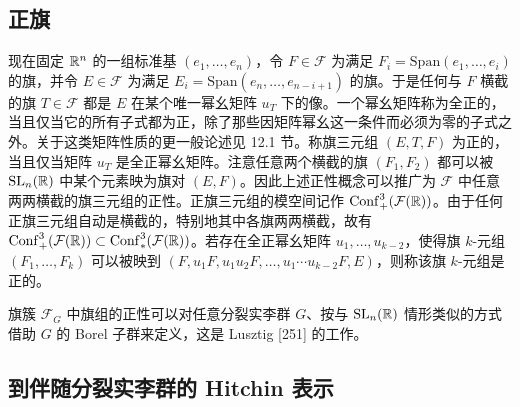 
\subsection{正旗}

现在固定 $\mathbb{R}^n$ 的一组标准基 $(e_1,\dots,e_n)$，令 $F\in\mathcal{F}$ 为满足 $F_i=\mathrm{Span}(e_1,\dots,e_i)$ 的旗，并令 $E\in\mathcal{F}$ 为满足 $E_i=\mathrm{Span}(e_n,\dots,e_{n-i+1})$ 的旗。于是任何与 $F$ 横截的旗 $T\in\mathcal{F}$ 都是 $E$ 在某个唯一幂幺矩阵 $u_T$ 下的像。一个幂幺矩阵称为全正的，当且仅当它的所有子式都为正，除了那些因矩阵幂幺这一条件而必须为零的子式之外。关于这类矩阵性质的更一般论述见 12.1 节。称旗三元组 $(E,T,F)$ 为正的，当且仅当矩阵 $u_T$ 是全正幂幺矩阵。注意任意两个横截的旗 $(F_1,F_2)$ 都可以被 $\operatorname{SL}_n(\mathbb{R})$ 中某个元素映为旗对 $(E,F)$。因此上述正性概念可以推广为 $\mathcal{F}$ 中任意两两横截的旗三元组的正性。正旗三元组的模空间记作 $\mathrm{Conf}^3_+(\mathcal{F}(\mathbb{R}))$。由于任何正旗三元组自动是横截的，特别地其中各旗两两横截，故有 $\mathrm{Conf}^3_+(\mathcal{F}(\mathbb{R}))\subset\mathrm{Conf}^3_*(\mathcal{F}(\mathbb{R}))$。若存在全正幂幺矩阵 $u_1,\dots,u_{k-2}$，使得旗 $k$-元组 $(F_1,\dots,F_k)$ 可以被映到 $(F,u_1F,u_1u_2F,\dots,u_1\cdots u_{k-2}F,E)$，则称该旗 $k$-元组是正的。


旗簇 $\mathcal{F}_G$ 中旗组的正性可以对任意分裂实李群 $G$、按与 $\operatorname{SL}_n(\mathbb{R})$ 情形类似的方式借助 $G$ 的 Borel 子群来定义，这是 Lusztig [251] 的工作。

\subsection{到伴随分裂实李群的 Hitchin 表示}

